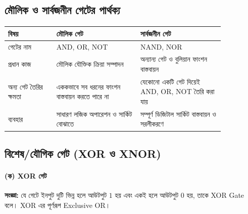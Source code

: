 

\subsection{মৌলিক ও সার্বজনীন গেটের পার্থক্য}

\begin{center}
\renewcommand{\arraystretch}{1.35}
\begin{tabular}{|L{0.19\linewidth}|L{0.33\linewidth}|L{0.33\linewidth}|}
\hline
\textbf{বিষয়} & \textbf{মৌলিক গেট} & \textbf{সার্বজনীন গেট} \\
\hline
গেটের নাম & \textenglish{AND, OR, NOT} & \textenglish{NAND, NOR} \\
\hline
প্রধান কাজ & মৌলিক যৌক্তিক ক্রিয়া সম্পাদন & অন্যান্য গেট ও বুলিয়ান ফাংশন বাস্তবায়ন \\
\hline
অন্য গেট তৈরির ক্ষমতা & এককভাবে সব ধরনের ফাংশন বাস্তবায়ন করতে পারে না & যেকোনো একটি গেট দিয়েই \textenglish{AND, OR, NOT} তৈরি করা যায় \\
\hline
ব্যবহার & সাধারণ লজিক অপারেশন ও সার্কিট বোঝাতে & সম্পূর্ণ ডিজিটাল সার্কিট বাস্তবায়ন ও সরলীকরণে \\
\hline
\end{tabular}
\end{center}


\subsection{বিশেষ/যৌগিক গেট (\textenglish{XOR} ও \textenglish{XNOR})}

\paragraph{(ক) \textenglish{XOR} গেট}

\textbf{সংজ্ঞা:}
যে গেটে ইনপুট দুটি ভিন্ন হলে আউটপুট \(1\) হয় এবং একই হলে আউটপুট \(0\) হয়, তাকে \textenglish{XOR Gate} বলে। \textenglish{XOR} এর পূর্ণরূপ \textenglish{Exclusive OR}।

